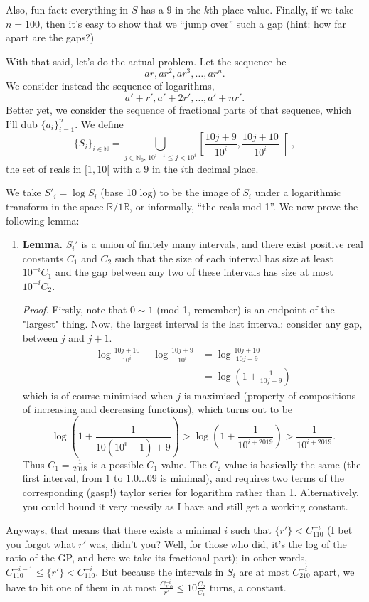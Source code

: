\documentclass[10pt]{article}
\begin{document}
	Also, fun fact: everything in $S$ has a $9$ in the $k$th place value. Finally, if we take $n=100$, then it's easy to show that we ``jump over'' such a gap (hint: how far apart are the gaps?)
	
	With that said, let's do the actual problem. Let the sequence be $$ar,ar^2,ar^3,\ldots,ar^n.$$ We consider instead the sequence of logarithms, $$a'+r',a'+2r',\ldots,a'+nr'.$$
	Better yet, we consider the sequence of fractional parts of that sequence, which I'll dub $\{a_i\}_{i=1}^n$.	We define $$ \{S_i\}_{i\in\mathbb N}=\bigcup_{j\in\mathbb N_0,\,10^{i-1}\le j<10^{i}}\left[\frac{10j+9}{10^{i}},\frac{10j+10}{10^{i}} \right[,$$ the set of reals in $[1,10[$ with a $9$ in the $i$th decimal place.
	
	We take $S'_i=\log S_i$ (base 10 log) to be the image of $S_i$ under a logarithmic transform in the space $\mathbb R/1\mathbb R$, or informally, ``the reals mod 1''. We now prove the following lemma:
	
	\begin{enumerate}
	\item \textbf{Lemma.} $S_i'$ is a union of finitely many intervals, and there exist positive real constants $C_1$ and $C_2$ such that the size of each interval has size at least $10^{-i}C_1$ and the gap between any two of these intervals has size at most $10^{-i}C_2$.
	
	\emph{Proof.} Firstly, note that $0\sim1$ (mod 1, remember) is an endpoint of the "largest" thing. Now, the largest interval is the last interval: consider any gap, between $j$ and $j+1$.
	\begin{align*}
	\log\frac{10j+10}{10^{i}}-\log\frac{10j+9}{10^{i}} &= \log\frac{10j+10}{10j+9}\\
	&=\log\left(1+\frac{1}{10j+9}\right)
	\end{align*}
	which is of course minimised when $j$ is maximised (property of compositions of increasing and decreasing functions), which turns out to be 
	$$\log\left(1+\frac{1}{10(10^i-1)+9}\right)>\log\left(1+\frac{1}{10^{i+2019}}\right)>\frac{1}{10^{i+2019}}.$$
	Thus $C_1=\frac{1}{2018}$ is a possible $C_1$ value. The $C_2$ value is basically the same (the first interval, from $1$ to $1.0...09$ is minimal), and requires two terms of the corresponding (gasp!) taylor series for logarithm rather than 1. Alternatively, you could bound it very messily as I have and still get a working constant.
	\end{enumerate}
	
	\noindent Anyways, that means that there exists a minimal $i$ such that $\{r'\}<C_110^{-i}$ (I bet you forgot what $r'$ was, didn't you? Well, for those who did, it's the log of the ratio of the GP, and here we take its fractional part); in other words, $C_110^{-i-1}\le\{r'\}<C_110^{-i}$. But because the intervals in $S_i$ are at most $C_210^{-i}$ apart, we have to hit one of them in at most $\frac{C_210^{-i}}{r'}\le10\frac{C_2}{C_1}$ turns, a constant.
\end{document}
